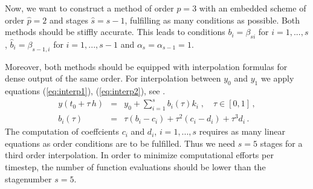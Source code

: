 \documentclass{juliacon}
\begin{document}
\begin{table} 
\label{tab:conditions}
\end{table}

Now, we want to construct a method of order $p=3$ with an embedded scheme of order $\hat p = 2$ and stages $\hat s = s-1$, fulfilling as many conditions as possible.
Both methods should be stiffly accurate. This leads to conditions $b_i = \beta_{s i}$ for $i=1,...,s$, $\hat b_i = \beta_{s-1,i}$ for $i=1,...,s-1$ and
$\alpha_s = \alpha_{s-1} = 1$.

Moreover, both methods should be equipped with interpolation formulas for dense output of the same order.
For interpolation between $y_0$ and $y_1$ we apply equations (\ref{eq:interp1}), (\ref{eq:interp2}), see \cite{hairer}.
\begin{eqnarray}
 y(t_0 + \tau \, h) &=& y_0 + \sum_{i=1}^s b_i(\tau) k_i \; , \quad \tau \in [0,1] \, ,\label{eq:interp1} \\
 b_i(\tau) &=& \tau (b_i-c_i) + \tau^2 (c_i-d_i) + \tau^3 d_i \, .\label{eq:interp2}
\end{eqnarray}
The computation of coeffcients $c_i$ and $d_i$, $i=1,...,s$ requires as many linear equations as order conditions are to be fulfilled. Thus
we need $s=5$ stages for a third order interpolation. In order to minimize
computational efforts per timestep, the number of function evaluations should be lower than the stagenumber $s=5$.
\end{document}
